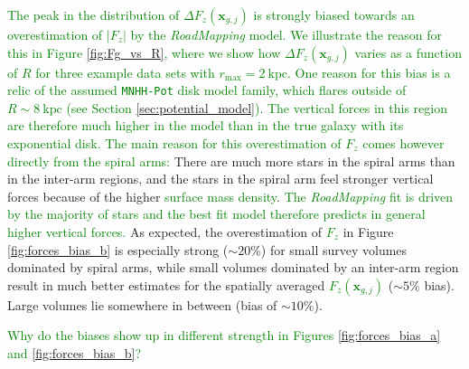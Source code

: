 \documentclass[iop,revtex4,numberedappendix,appendixfloats]{emulateapj}
\newcommand{\vect}[1]{\boldsymbol{#1}}
\newcommand{\RM}{{\sl RoadMapping}}
\newcommand{\NEW}[1]{\textcolor{Green}{#1}}
\newcommand{\OLD}[1]{}
\begin{document}
\NEW{The peak in the distribution of $\Delta F_z(\vect{x}_{g,j})$ is strongly biased towards an overestimation of $|F_{z}|$ by the \RM{} model. We illustrate the reason for this in Figure \ref{fig:Fg_vs_R}, where we show how $\Delta F_z(\vect{x}_{g,j})$ varies as a function of $R$ for three example data sets with $r_\text{max}=2~\text{kpc}$. One reason for this bias is a relic of the assumed \texttt{MNHH-Pot} disk model family, which flares outside of $R\sim8~\text{kpc}$ (see Section \ref{sec:potential_model}). The vertical forces in this region are therefore much higher in the model than in the true galaxy with its exponential disk. The main reason for this overestimation of $F_z$ comes however directly from the spiral arms:} \OLD{The peak of $\Delta F_z(*_i)$ in Figure \ref{fig:forces_bias_a} is approximately at 0, while the peak of $\Delta F_z(g_j)$ is strongly biased towards an overestimation of $|F_{z,M}|$.} There are much more stars in the spiral arms than in the inter-arm regions, and the stars in the spiral arm feel stronger vertical forces because of the higher \OLD{disk mass}\NEW{surface mass density}. \NEW{The \RM{} fit is driven by the majority of stars and the best fit model therefore predicts in general higher vertical forces.} \OLD{\RM{} finds a model that in general has much stronger vertical forces than expected for a smooth potential. While the actual vertical forces that the many stars in the spiral arms feel are very well recovered, it becomes obvious when looking at the grid points regularly distributed in space that the \RM{} vertical forces are too strong on a spatial average. We illustrate this also in Figure \ref{fig:Fg_vs_z_and_R}: Regions far away from the strongest spiral arms (at large $R$ and large $|z|$, see Figure \ref{fig:simulation}) are not well described by a potential derived mostly from stars in spiral arms.} As expected, the overestimation of \OLD{$|F_{z,T}(g_j)|$}\NEW{$F_{z}$} in Figure \ref{fig:forces_bias_b} is especially strong ($\sim 20 \%$) for small survey volumes dominated by spiral arms, while small volumes dominated by an inter-arm region result in much better estimates for the spatially averaged \OLD{$F_z(g_j)$}\NEW{$F_z(\vect{x}_{g,j})$} ($\sim5\%$ bias). Large volumes lie somewhere in between (bias of $\sim10\%$).

\NEW{Why do the biases show up in different strength in Figures \ref{fig:forces_bias_a} and \ref{fig:forces_bias_b}?}
\end{document}
